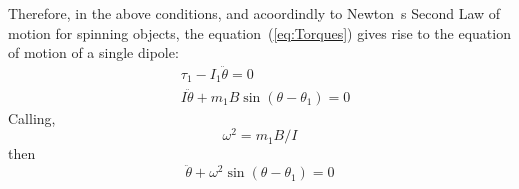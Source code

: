 Therefore, in the above conditions, and acoordindly to Newton~\textquotesingle s Second Law of motion for spinning objects, the equation~(\ref{eq:Torques}) gives rise to the equation of motion of a single dipole:
\begin{equation}
    \begin{aligned}
        &\tau_1 - I_1 \ddot{\theta} = 0\\
        &I \ddot{\theta} + m_1 B \sin(\theta - \theta_1) = 0        
    \end{aligned}
\end{equation}
Calling,
\begin{equation}
    \omega^2 = m_1 B/I 
\end{equation} 
then
\begin{equation}
    \ddot{\theta} +\omega^2 \sin(\theta - \theta_1) = 0
\end{equation}


